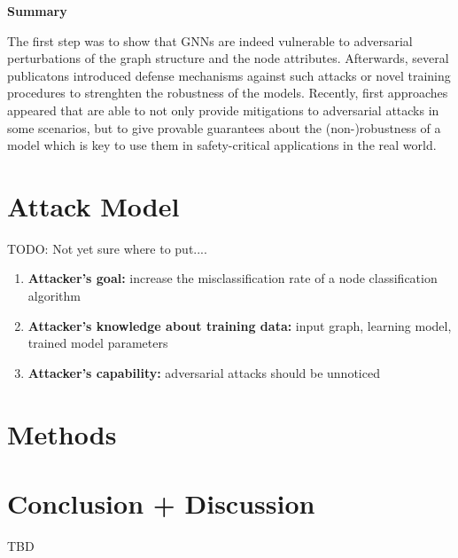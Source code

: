 \documentclass[a4paper,preprint]{sig-alternate}
\begin{document}
\textbf{Summary}\newline

The first step was to show that GNNs are indeed vulnerable to adversarial perturbations of the graph structure and the node attributes.
Afterwards, several publicatons introduced defense mechanisms against such attacks or novel training procedures to strenghten the robustness
of the models. Recently, first approaches appeared that are able to not only provide mitigations to adversarial attacks in some scenarios,
but to give provable guarantees about the (non-)robustness of a model which is key to use them in safety-critical applications in the
real world.

\section{Attack Model}

TODO: Not yet sure where to put....

\begin{enumerate}
    \item \textbf{Attacker's goal:} increase the misclassification rate of a node classification algorithm
    \item \textbf{Attacker's knowledge about training data:} input graph, learning model, trained model parameters
    \item \textbf{Attacker's capability:} adversarial attacks should be unnoticed 
\end{enumerate}

\section{Methods}

\pagebreak

\section{Conclusion + Discussion}
TBD

\pagebreak



\end{document}
